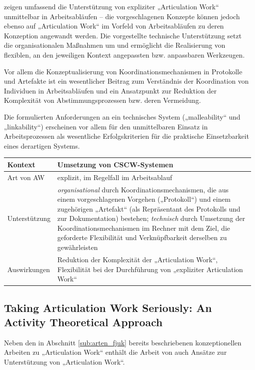 \citet{Schmidt96} zeigen umfassend die Unterstützung von expliziter „Articulation Work“ unmittelbar in Arbeitsabläufen -- die vorgeschlagenen Konzepte können jedoch ebenso auf „Articulation Work“ im Vorfeld von Arbeitsabläufen zu deren Konzeption angewandt werden. Die vorgestellte technische Unterstützung setzt die organisationalen Maßnahmen um und ermöglicht die Realisierung von flexiblen, an den jeweiligen Kontext angepassten bzw. anpassbaren Werkzeugen.

Vor allem die Konzeptualisierung von Koordinationsmechanismen in Protokolle und Artefakte ist ein wesentlicher Beitrag zum Verständnis der Koordination von Individuen in Arbeitsabläufen und ein Ansatzpunkt zur Reduktion der Komplexität von Abstimmungsprozessen bzw. deren Vermeidung.

Die formulierten Anforderungen an ein technisches System („malleability“ und „linkability“) erscheinen vor allem für den unmittelbaren Einsatz in Arbeitsprozessen als wesentliche Erfolgskriterien für die praktische Einsetzbarkeit eines derartigen Systems.
\\[1em]
\begin{tabular}{| p{3cm} | p{10cm} |}
  \hline
  Kontext & Umsetzung von \gls{CSCW}-Systemen \\ \hline
  Art von AW & explizit, im Regelfall im Arbeitsablauf \\ \hline
  Unterstützung & \emph{organisational} durch Koordinationsmechanismen, die aus einem vorgeschlagenen Vorgehen („Protokoll“) und einem zugehörigen „Artefakt“ (als Repräsentant des Protokolls und zur Dokumentation) bestehen; \emph{technisch} durch Umsetzung der Koordinationsmechanismen im Rechner mit dem Ziel, die geforderte Flexibilität und Verknüpfbarkeit derselben zu gewährleisten \\ \hline
  Auswirkungen & Reduktion der Komplexität der „Articulation Work“, Flexibilität bei der Durchführung von „expliziter Articulation Work“ \\ \hline
\end{tabular}

\subsection{Taking Articulation Work Seriously: An Activity Theoretical Approach}
\label{sub:taking_articulation_work_seriously}

Neben den in Abschnitt \ref{sub:arten_fjuk} bereits beschriebenen konzeptionellen Arbeiten zu „Articulation Work“ enthält die Arbeit von \citet{Fjuk97} auch Ansätze zur Unterstützung von „Articulation Work“.

